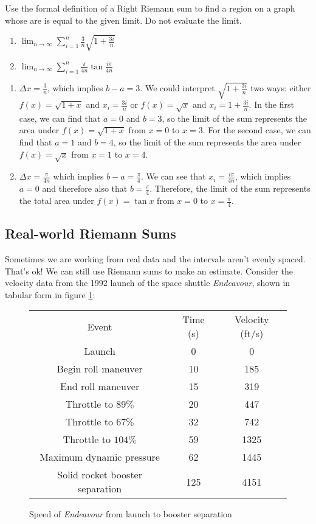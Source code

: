 \begin{Exercise}[label=limsum2]
Use the formal definition of a Right Riemann sum to find a region on a graph whose are is equal to the given limit. Do not evaluate the limit. 
\begin{enumerate}
\item $\lim_{n\to \infty} \sum_{i=1}^{n}\frac{3}{n}\sqrt{1+\frac{3i}{n}}$
\item $\lim_{n\to\infty} \sum_{i=1}^{n}\frac{\pi}{4n}\tan{\frac{i\pi}{4n}}$
\end{enumerate}
\end{Exercise}

\begin{Answer}[ref=limsum2]
\begin{enumerate}
\item $\Delta x = \frac{3}{n}$, which implies $b-a=3$. We could interpret $\sqrt{1+\frac{3i}{n}}$ two ways: either $f(x) = \sqrt{1+x}$ and $x_i = \frac{3i}{n}$ or $f(x) = \sqrt{x}$ and $x_i=1+\frac{3i}{n}$. In the first case, we can find that $a=0$ and $b=3$, so the limit of the sum represents the area under $f(x) = \sqrt{1+x}$ from $x=0$ to $x=3$. For the second case, we can find that $a=1$ and $b=4$, so the limit of the sum represents the area under $f(x) = \sqrt{x}$ from $x=1$ to $x=4$. 
\item $\Delta x = \frac{\pi}{4n}$ which implies $b-a=\frac{\pi}{4}$. We can see that $x_i = \frac{i\pi}{4n}$, which implies $a=0$ and therefore also that $b=\frac{\pi}{4}$. Therefore, the limit of the sum represents the total area under $f(x) = \tan{x}$ from $x=0$ to $x=\frac{\pi}{4}$. 
\end{enumerate}
\end{Answer}

\subsection{Real-world Riemann Sums}
Sometimes we are working from real data and the intervals aren't evenly spaced. That's ok! We can still use Riemann sums to make an estimate. Consider the velocity data from the 1992 launch of the space shuttle \textit{Endeavour}, shown in tabular form in figure \ref{fig:endeavourdata}:

\begin{figure}
	\centering
	\begin{tabular}{c|c|c}
	Event & Time (s) & Velocity (ft/s) \\
	Launch & 0 & 0 \\
	Begin roll maneuver & 10 & 185 \\
	End roll maneuver & 15 & 319 \\
	Throttle to $89\%$ & 20 & 447 \\
	Throttle to $67\%$ & 32 & 742 \\
	Throttle to $104\%$ & 59 & 1325 \\
	Maximum dynamic pressure & 62 & 1445 \\
	Solid rocket booster separation & 125 & 4151 \\
	\end{tabular}
	\caption{Speed of \textit{Endeavour} from launch to booster separation}
	\label{fig:endeavourdata}
\end{figure}

